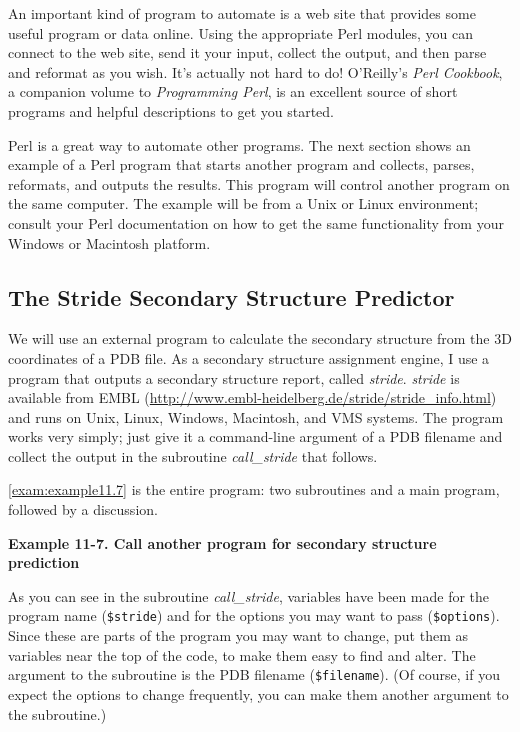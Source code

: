 An important kind of program to automate is a web site that provides some useful program or data online. Using the appropriate Perl modules, you can connect to the web site, send it your input, collect the output, and then parse and reformat as you wish. It's actually not hard to do! O'Reilly's \textit{Perl Cookbook}, a companion volume to \textit{Programming Perl}, is an excellent source of short programs and helpful descriptions to get you started.

Perl is a great way to automate other programs. The next section shows an example of a Perl program that starts another program and collects, parses, reformats, and outputs the results. This program will control another program on the same computer. The example will be from a Unix or Linux environment; consult your Perl documentation on how to get the same functionality from your Windows or Macintosh platform. 

\subsection{The Stride Secondary Structure Predictor}
We will use an external program to calculate the secondary structure from the 3D coordinates of a PDB file. As a secondary structure assignment engine, I use a program that outputs a secondary structure report, called \textit{stride}. \textit{stride} is available from EMBL (\href{http://www.embl-heidelberg.de/stride/stride\_info.html}{http://www.embl-heidelberg.de/stride/stride\_info.html}) and runs on Unix, Linux, Windows, Macintosh, and VMS systems. The program works very simply; just give it a command-line argument of a PDB filename and collect the output in the subroutine \textit{call\_stride} that follows.

\autoref{exam:example11.7} is the entire program: two subroutines and a main program, followed by a discussion. 

\textbf{Example 11-7. Call another program for secondary structure prediction}


As you can see in the subroutine \textit{call\_stride}, variables have been made for the program name (\verb|$stride|) and for the options you may want to pass (\verb|$options|). Since these are parts of the program you may want to change, put them as variables near the top of the code, to make them easy to find and alter. The argument to the subroutine is the PDB filename (\verb|$filename|). (Of course, if you expect the options to change frequently, you can make them another argument to the subroutine.)


